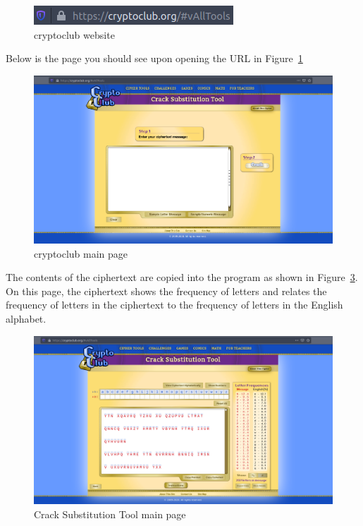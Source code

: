 \documentclass[12pt]{article}
\begin{document}
\begin{figure}[!ht]
    \begin{center}
        \includegraphics[scale=0.65]{c0.1.png}
    \end{center}{}
    \caption{cryptoclub website}
    \label{fig:c0.1}
\end{figure}

\clearpage

Below is the page you should see upon opening the URL in Figure~\ref{fig:c0.1}

\begin{figure}[!ht]
    \begin{center}
        \includegraphics[scale=0.3]{c1.png}
    \end{center}{}
    \caption{cryptoclub main page}
    \label{fig:c1}
\end{figure}


The contents of the ciphertext are copied into the program as shown in Figure~\ref{fig:c3}. On this page, the ciphertext
shows the frequency of letters and relates the frequency of letters in the ciphertext to the frequency of letters in the
English alphabet.


\begin{figure}[!ht]
    \begin{center}
        \includegraphics[scale=0.3]{c3.png}
    \end{center}{}
    \caption{Crack Substitution Tool main page}
    \label{fig:c3}
\end{figure}
\end{document}

